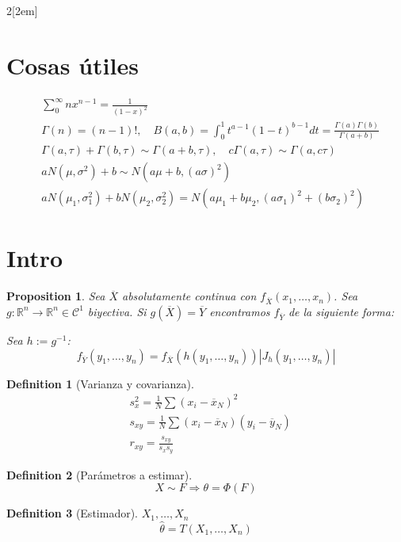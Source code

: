 \documentclass[leqno]{article}
\newtheorem*{proposition}{Proposition}
\newtheorem*{definition}{Definition}
\begin{document}
\begin{multicols}{2}[\columnsep2em]

\section{Cosas útiles}
\begin{align*}
  &\sum_{0}^\infty nx^{n-1} = \frac{1}{(1-x)^2} \\
  &\Gamma (n) = (n-1)!, \quad B(a, b) = \int_0^1 t^{a-1}(1-t)^{b-1}dt = \frac{\Gamma (a)\Gamma (b)}{\Gamma (a+b)}\\
  &\Gamma (a, \tau ) +  \Gamma (b, \tau ) \sim \Gamma (a+b, \tau ) , \quad c\Gamma(a, \tau ) \sim  \Gamma (a, c\tau )\\
  &aN(\mu, \sigma ^2) + b \sim N(a\mu+b, (a\sigma )^2) \\
  &aN(\mu_1, \sigma_1^2) + bN(\mu_2, \sigma _2^2) = N(a\mu_1+b\mu_2, (a\sigma_1)^2+(b\sigma _2)^2)
\end{align*}

\section{Intro}

 \begin{proposition}
Sea $\overline{X}$ absolutamente continua con $f_{\overline{X}}(x_1,\ldots,x_n)$. Sea $g:\mathbb{R}^n\to \mathbb{R}^n \in \mathcal{C}^1$ biyectiva. Si  $g(\overline{X})=\overline{Y}$ encontramos $f_{\overline{Y}}$ de la siguiente forma:

Sea $h:=g^{-1}$:
\[
f_{\overline{Y}}(y_1, \ldots, y_n) = f_{\overline{X}}(h(y_1,\ldots,y_n))|J_h(y_1,\ldots,y_n)|
\] 
\end{proposition}

\begin{definition}[Varianza y covarianza]
  \begin{align*}
&s_x^2 = \frac{1}{N}\sum (x_i-\overline{x}_N)^2\\
&s_{xy}=\frac{1}{N}\sum(x_i-\overline{x}_N)(y_i-\overline{y}_N) \\
&r_{xy} = \frac{s_{xy}}{s_xs_y}
  \end{align*}
\end{definition}

\begin{definition}[Parámetros a estimar]
\[
X \sim F \Rightarrow \theta = \Phi(F)
\] 
\end{definition}

\begin{definition}[Estimador] $X_1, \ldots, X_n$
\[
\hat{\theta } = T(X_1, \ldots, X_n)
\] 
\end{definition}


\end{multicols}
\end{document}
